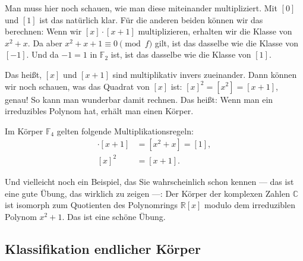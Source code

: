 \begin{spoken-clean}[01:00:12 - 01:02:59]
Man muss hier noch schauen, wie man diese miteinander multipliziert. Mit $[0]$ und $[1]$ ist das natürlich klar. Für die anderen beiden können wir das berechnen: Wenn wir $[x] \cdot [x+1]$ multiplizieren, erhalten wir die Klasse von $x^2 + x$. Da aber $x^2 + x + 1 \equiv 0 \pmod f$ gilt, ist das dasselbe wie die Klasse von $[-1]$. Und da $-1 = 1$ in $\mathbb{F}_2$ ist, ist das dasselbe wie die Klasse von $[1]$.

Das heißt, $[x]$ und $[x+1]$ sind multiplikativ invers zueinander. Dann können wir noch schauen, was das Quadrat von $[x]$ ist: $[x]^2 = [x^2] = [x+1]$, genau! So kann man wunderbar damit rechnen. Das heißt: Wenn man ein irreduzibles Polynom hat, erhält man einen Körper.
\end{spoken-clean}

\begin{math-stroke}
Im Körper $\mathbb{F}_4$ gelten folgende Multiplikationsregeln:
\begin{align*}
[x] \cdot [x+1] &= [x^2 + x] = [1], \\
[x]^2 &= [x+1].
\end{align*}
\end{math-stroke}

\begin{spoken-clean}[01:02:59 - 01:05:39]
Und vielleicht noch ein Beispiel, das Sie wahrscheinlich schon kennen --- das ist eine gute Übung, das wirklich zu zeigen ---: Der Körper der komplexen Zahlen $\mathbb{C}$ ist isomorph zum Quotienten des Polynomrings $\mathbb{R}[x]$ modulo dem irreduziblen Polynom $x^2 + 1$. Das ist eine schöne Übung.
\end{spoken-clean}

\begin{math-stroke}
\end{math-stroke}

\subsection{Klassifikation endlicher Körper}

